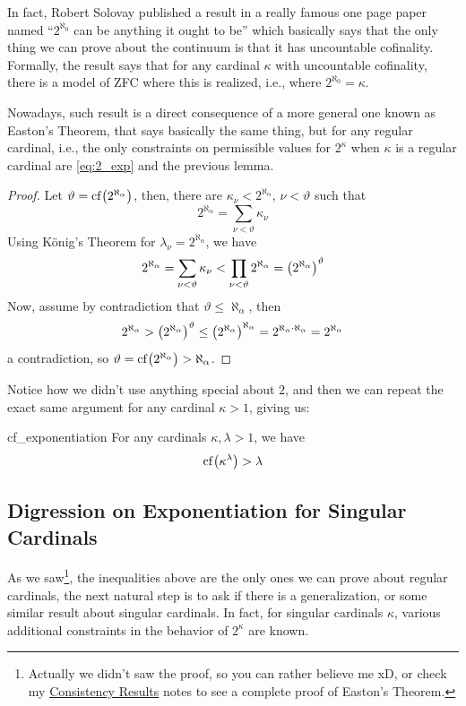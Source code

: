 In fact, Robert Solovay published a result in a really famous one page paper named ``$2^{\aleph_0}$ can be anything it ought to be'' which basically says that the only thing we can prove about the continuum is that it has uncountable cofinality. Formally, the result says that for any cardinal $\kappa$ with uncountable cofinality, there is a model of ZFC where this is realized, i.e., where $2^{\aleph_0}=\kappa$.

Nowadays, such result is a direct consequence of a more general one known as Easton's Theorem, that says basically the same thing, but for any regular cardinal, i.e., the only constraints on permissible values for $2^\kappa$ when $\kappa$ is a regular cardinal are \cref{eq:2_exp} and the previous lemma.

\begin{proof}
    Let $\vartheta=\mathrm{cf}\!\left(2^{\aleph_\alpha}\right)$, then, there are $\kappa_\nu<2^{\aleph_\alpha}$, $\nu<\vartheta$ such that
    $$2^{\aleph_\alpha}=\sum_{\nu<\vartheta}\kappa_\nu$$
    Using König's Theorem for $\lambda_\nu=2^{\aleph_\alpha}$, we have
    $$2^{\aleph_\alpha}=\sum_{\nu<\vartheta}\kappa_\nu<\prod_{\nu<\vartheta}2^{\aleph_\alpha}={\left(2^{\aleph_\alpha}\right)}^\vartheta$$
    Now, assume by contradiction that $\vartheta\leq\aleph_\alpha$, then
    $$2^{\aleph_\alpha}>{\left(2^{\aleph_\alpha}\right)}^\vartheta\leq{\left(2^{\aleph_\alpha}\right)}^{\aleph_\alpha}=2^{\aleph_\alpha\cdot\aleph_\alpha}=2^{\aleph_\alpha}$$
    a contradiction, so $\vartheta=\mathrm{cf}\!\left(2^{\aleph_\alpha}\right)>\aleph_\alpha$.
\end{proof}

Notice how we didn't use anything special about $2$, and then we can repeat the exact same argument for any cardinal $\kappa>1$, giving us:

\begin{corollary}{}{cf_exponentiation}
    For any cardinals $\kappa,\lambda>1$, we have
    $$\mathrm{cf}\!\left(\kappa^\lambda\right)>\lambda$$
\end{corollary}

\subsection{Digression on Exponentiation for Singular Cardinals}

As we saw\footnote{Actually we didn't saw the proof, so you can rather believe me xD, or check my \href{https://github.com/Xennonio/Consistency-Results}{Consistency Results} notes to see a complete proof of Easton's Theorem.}, the inequalities above are the only ones we can prove about regular cardinals, the next natural step is to ask if there is a generalization, or some similar result about singular cardinals. In fact, for singular cardinals $\kappa$, various additional constraints in the behavior of $2^\kappa$ are known.

